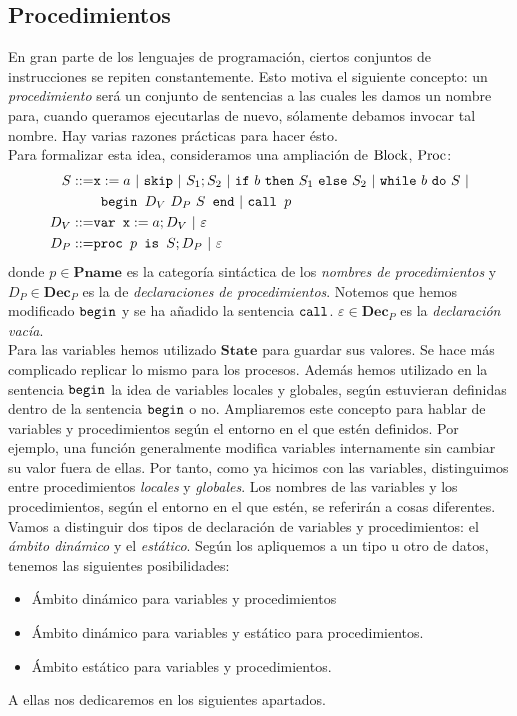 \subsection{Procedimientos}
En gran parte de los lenguajes de programación, ciertos conjuntos de instrucciones se repiten constantemente. Esto motiva el siguiente concepto: un \textit{procedimiento} será un conjunto de sentencias a las cuales les damos un nombre para, cuando queramos ejecutarlas de nuevo, sólamente debamos invocar tal nombre. Hay varias razones prácticas para hacer ésto.
\\ 

Para formalizar esta idea, consideramos una ampliación de $\mathrm{Block}$, $\mathrm{Proc}$:
\begin{align*}
        S ::= &\n{x}:=a\ |\ \n{skip}\ |\ S_1;S_2\ |\ \n{if}\ b\ \n{then}\ S_1\ \n{else}\ S_2\ |\ \n{while}\ b\ \n{do}\ S \ |\\ & \n{ begin }D_V\ D_P\ S\n{ end}\ |\ \n{call }p \\
    D_V ::= &\n{var x} := a; D_V\ |\ \varepsilon \\
    D_P ::= &\n{proc }p\n{ is }S; D_P\ |\ \varepsilon
\end{align*}
donde $p \in \mathbf{Pname}$ es la categoría sintáctica de los \textit{nombres de procedimientos} y $D_P \in \mathbf{Dec}_P$ es la de \textit{declaraciones de procedimientos}. Notemos que hemos modificado $\texttt{begin}$ y se ha añadido la sentencia $\texttt{call}$. $\varepsilon\in \mathbf{Dec}_P$ es la \textit{declaración vacía}.
\\

Para las variables hemos utilizado $\textbf{State}$ para guardar sus valores. Se hace más complicado replicar lo mismo para los procesos. Además hemos utilizado en la sentencia $\texttt{begin}$ la idea de variables locales y globales, según estuvieran definidas dentro de la sentencia $\texttt{begin}$ o no. Ampliaremos este concepto para hablar de variables y procedimientos según el entorno en el que estén definidos. Por ejemplo, una función generalmente modifica variables internamente sin cambiar su valor fuera de ellas. Por tanto, como ya hicimos con las variables, distinguimos entre procedimientos \textit{locales} y \textit{globales}. Los nombres de las variables y los procedimientos, según el entorno en el que estén, se referirán a cosas diferentes. Vamos a distinguir dos tipos de declaración de variables y procedimientos: el \textit{ámbito dinámico} y el \textit{estático}. Según los apliquemos a un tipo u otro de datos, tenemos las siguientes posibilidades:
\begin{itemize}
    \item Ámbito dinámico para variables y procedimientos
    \item Ámbito dinámico para variables y estático para procedimientos.
    \item Ámbito estático para variables y procedimientos.
\end{itemize}
A ellas nos dedicaremos en los siguientes apartados.

